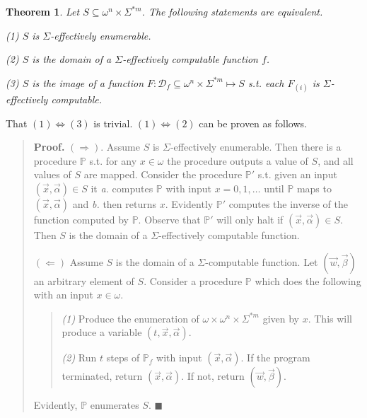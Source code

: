 \documentclass[a4paper, 12pt]{article}
\newtheorem{theorem}{Theorem}
\newtheorem{theorem}{Theorem}
\begin{document}
\begin{theorem}
    Let $S \subseteq \omega^{n} \times \Sigma^{*m} $. The following statements are equivalent. 

    \textit{(1)} $S$ is $\Sigma$-effectively enumerable. 

    \textit{(2)} $S$ is the domain of a $\Sigma$-effectively computable function
    $f$.  

    \textit{(3)} $S$ is the image of a function $F: \mathcal{D}_f \subseteq
    \omega^{n} \times \Sigma^{*m} \mapsto S$ s.t. each $F_{(i)}$ is
    $\Sigma$-effectively computable.
\end{theorem}

That $(1) \Leftrightarrow (3)$ is trivial. $(1) \Leftrightarrow (2)$ can be proven as
follows. 


\small
\begin{quote}

\textbf{Proof.} $(\Rightarrow)$. Assume $S$ is $\Sigma$-effectively enumerable.
Then there is a procedure $\mathbb{P}$ s.t. for any $x \in  \omega$ the
procedure outputs a value of $S$, and all values of $S$ are mapped. Consider the
procedure $\mathbb{P}'$ s.t. given an input $(\vec{x}, \vec{\alpha}) \in S$ it
\textit{a.} computes $\mathbb{P}$ with input  $x = 0, 1, \ldots$ until
$\mathbb{P}$ maps to $(\vec{x}, \vec{\alpha})$ and \textit{b.} then returns $x$.
Evidently $\mathbb{P}'$ computes the inverse of the function computed by
$\mathbb{P}$. Observe that $\mathbb{P}'$ will only halt if $(\vec{x},
\vec{\alpha}) \in S$. Then $S$ is the domain of a $\Sigma$-effectively
computable function.

$(\Leftarrow)$ Assume $S$ is the domain of a $\Sigma$-computable function. Let 
$(\vec{w}, \vec{\beta})$ an arbitrary element of $S$. Consider a procedure
$\mathbb{P}$ which does the following with an input $x \in \omega$.

\begin{quote}
    \textit{(1)} Produce the enumeration of $\omega \times \omega^{n} \times
    \Sigma^{*m} $ given by $x$. This will produce a variable $(t, \vec{x},
    \vec{\alpha})$.

    \textit{(2)} Run $t$ steps of $\mathbb{P}_f$ with input $(\vec{x},
    \vec{\alpha}) $. If the program terminated, return $(\vec{x},
    \vec{\alpha})$. If not, return $(\vec{w}, \vec{\beta})$.
\end{quote}

Evidently, $\mathbb{P}$ enumerates $S$. $\blacksquare$

\end{quote}
\normalsize
\end{document}
